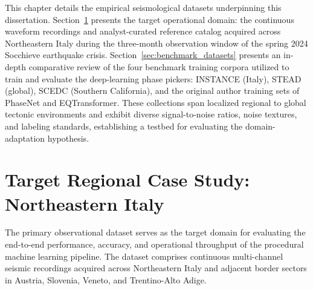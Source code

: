 
\label{chap:Datasets}

This chapter details the empirical seismological datasets underpinning this dissertation. Section~\ref{sec:case_study} presents the target operational domain: the continuous waveform recordings and analyst-curated reference catalog acquired across Northeastern Italy during the three-month observation window of the spring 2024 Socchieve earthquake crisis. Section~\ref{sec:benchmark_datasets} presents an in-depth comparative review of the four benchmark training corpora utilized to train and evaluate the deep-learning phase pickers: \ac{INSTANCE} (Italy), \ac{STEAD} (global), \ac{SCEDC} (Southern California), and the original author training sets of PhaseNet and \ac{EQTransformer}. These collections span localized regional to global tectonic environments and exhibit diverse signal-to-noise ratios, noise textures, and labeling standards, establishing a testbed for evaluating the domain-adaptation hypothesis.

\section{Target Regional Case Study: Northeastern Italy}
\label{sec:case_study}

The primary observational dataset serves as the target domain for evaluating the end-to-end performance, accuracy, and operational throughput of the procedural machine learning pipeline. The dataset comprises continuous multi-channel seismic recordings acquired across Northeastern Italy and adjacent border sectors in Austria, Slovenia, Veneto, and Trentino-Alto Adige.

